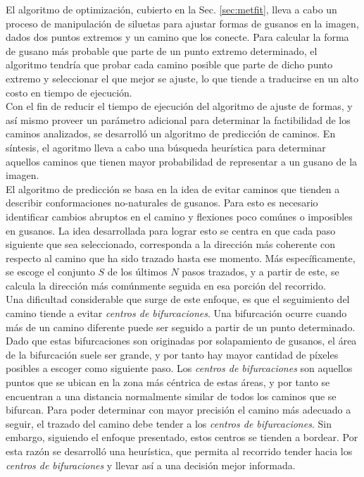 El algoritmo de optimizaci\'on, cubierto en la Sec. \ref{sec:metfit}, lleva a cabo un
proceso de manipulaci\'on de siluetas para ajustar formas de gusanos en la imagen, dados
dos puntos extremos y un camino que los conecte. Para calcular la forma de gusano m\'as probable
que parte de un punto extremo determinado, el algoritmo tendr\'ia que probar cada camino posible
que parte de dicho punto extremo y seleccionar el que mejor se ajuste, lo que tiende a traducirse  
en un alto costo en tiempo de ejecuci\'on.\\
Con el fin de reducir el tiempo de ejecuci\'on del algoritmo de ajuste de
formas, y as\'i mismo proveer un par\'ametro adicional para determinar la
factibilidad de los caminos analizados, se desarroll\'o un algoritmo de
predicci\'on de caminos. En s\'intesis, el agoritmo lleva a cabo una b\'usqueda
heur\'istica para determinar aquellos caminos que tienen mayor probabilidad
de representar a un gusano de la imagen.\\

El algoritmo de predicci\'on se basa en la idea de evitar caminos que
tienden a describir conformaciones no-naturales de gusanos. Para esto
es necesario identificar cambios abruptos en el camino y flexiones
poco com\'unes o imposibles en gusanos. La idea desarrollada para lograr
esto se centra en que cada paso siguiente que sea seleccionado, corresponda
a la direcci\'on m\'as coherente con respecto al camino que ha sido
trazado hasta ese momento. 
M\'as espec\'ificamente, se escoge el conjunto $S$ de los \'ultimos $N$ 
pasos trazados, y a partir de este, se calcula la direcci\'on m\'as com\'unmente
seguida en esa porci\'on del recorrido.\\

Una dificultad considerable que surge de este
enfoque, es que el seguimiento del camino tiende a evitar \emph{centros de bifurcaciones}.
Una bifurcaci\'on ocurre cuando m\'as de un camino diferente puede ser seguido a partir
de un punto determinado. Dado que estas bifurcaciones son originadas por solapamiento 
de gusanos, el \'area de la bifurcaci\'on suele ser grande, y por tanto hay mayor 
cantidad de p\'ixeles posibles a escoger como siguiente paso. Los \emph{centros de bifurcaciones}
son aquellos puntos que se ubican en la zona m\'as c\'entrica de estas \'areas, y por tanto
se encuentran a una distancia normalmente similar de todos los caminos que se bifurcan.
Para poder determinar con mayor precisi\'on el camino m\'as adecuado a seguir, el trazado del camino 
debe tender a los \emph{centros de bifurcaciones}. Sin embargo, siguiendo el enfoque presentado, estos
centros se tienden a bordear. Por esta raz\'on se desarroll\'o una heur\'istica, que permita
al recorrido tender hacia los \emph{centros de bifuraciones} y llevar as\'i a una 
decisi\'on mejor informada.\\

